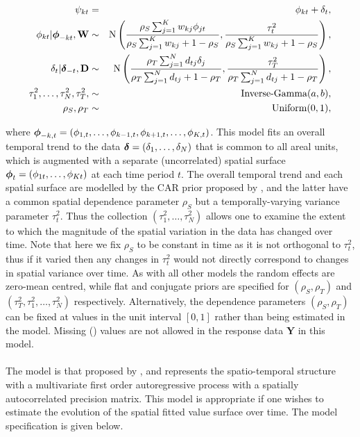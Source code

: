 \documentclass[article, nojss]{jss}
\newcommand{\bd}[1]{\ensuremath{\mbox{\boldmath $#1$}}}
\begin{document}
\begin{eqnarray}
\psi_{kt}&=&\phi_{kt} +  \delta_t,\label{carsepspat}\\
\phi_{kt}|\bd{\phi}_{-kt},\mathbf{W}&\sim&\mbox{N}\left(\frac{\rho_{S}\sum_{j=1}^Kw_{kj}\phi_{jt}}{\rho_{S}\sum_{j=1}^Kw_{kj} + 1-\rho_{S}}, \frac{\tau^2_{t}}{\rho_{S}\sum_{j=1}^Kw_{kj} + 1-\rho_{S}}\right),\nonumber\\
\delta_t|\bd{\delta}_{-t},\mathbf{D}&\sim&\mbox{N}\left(\frac{\rho_{T}\sum_{j=1}^N d_{tj}\delta_j}{\rho_{T}\sum_{j=1}^N d_{tj} + 1-\rho_{T}}, \frac{\tau^2_{T}}{\rho_{T}\sum_{j=1}^N d_{tj}+1-\rho_{T}}\right),\nonumber\\
\tau^2_{1},\ldots, \tau^2_{N}, \tau^2_{T}, &\sim&\mbox{Inverse-Gamma}(a,b),\nonumber\\
\rho_{S}, \rho_{T}&\sim&\mbox{Uniform}(0,1),\nonumber
\end{eqnarray}

where $\bd{\phi}_{-k,t}=(\phi_{1,t},\ldots,\phi_{k-1,t}, \phi_{k+1,t},\ldots,\phi_{K,t})$. This model fits an overall temporal trend to the data $\bd{\delta}=(\delta_1,\ldots,\delta_{N})$ that is common to all areal units, which is augmented with a separate (uncorrelated) spatial surface $\bd{\phi}_t=(\phi_{1t},\ldots, \phi_{Kt})$ at each time period $t$. The overall temporal trend and each spatial surface are modelled by the CAR prior proposed by \cite{leroux2000}, and the latter have a common spatial dependence parameter $\rho_S$ but a temporally-varying variance parameter $\tau^2_{t}$. Thus the collection $(\tau^2_{1},\ldots, \tau^2_{N})$ allows one to examine the extent to which the magnitude of the spatial variation in the data has changed over time. Note that here we fix $\rho_S$ to be constant in time as it is not orthogonal to $\tau^{2}_t$, thus if it varied then any changes in $\tau^{2}_t$ would not directly correspond to changes in spatial variance over time. As with all other models the random effects are zero-mean centred, while flat and conjugate priors are specified for $(\rho_S, \rho_T)$ and $(\tau^2_{T}, \tau^2_{1},\ldots, \tau^2_{N})$ respectively. Alternatively, the  dependence parameters $(\rho_{S}, \rho_{T})$ can be fixed at values in the unit interval $[0,1]$ rather than being estimated in the model. Missing () values are not allowed in the response data $\mathbf{Y}$ in this model.\\




\\
The model is that proposed by \cite{rushworth2014}, and represents the spatio-temporal structure with a multivariate first order autoregressive process with a spatially autocorrelated precision matrix. This model is appropriate if one wishes to estimate the  evolution of the spatial fitted value surface over time. The model specification is given below.
\end{document}
